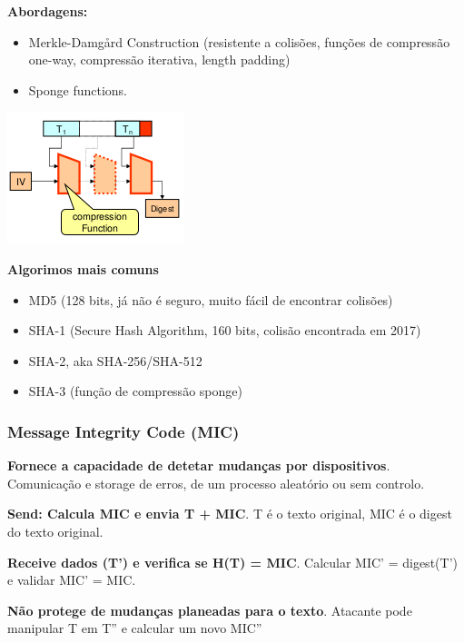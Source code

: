 \documentclass{article}
\begin{document}
\begin{flushleft}
  \textbf{Abordagens:}
  \begin{itemize}
    \item Merkle-Damgård Construction (resistente a colisões, funções
    de compressão one-way, compressão iterativa, length padding)
    \item Sponge functions.
  \end{itemize}

  \begin{center}
    \includegraphics[scale=0.4]{96}
  \end{center}

  \vspace{2mm}

  \textbf{Algorimos mais comuns}
  \begin{itemize}
    \item MD5 (128 bits, já não é seguro, muito fácil de encontrar colisões)
    \item SHA-1 (Secure Hash Algorithm, 160 bits, colisão encontrada em 2017)
    \item SHA-2, aka SHA-256/SHA-512
    \item SHA-3 (função de compressão sponge)
  \end{itemize}
\end{flushleft}

\subsubsection{Message Integrity Code (MIC)}

\begin{flushleft}
    \textbf{Fornece a capacidade de detetar mudanças por dispositivos}.
    Comunicação e storage de erros, de um processo aleatório ou sem controlo.

    \vspace{2mm}

    \textbf{Send: Calcula MIC e envia T + MIC}. T é o texto original, MIC é o
    digest do texto original.

    \vspace{2mm}

    \textbf{Receive dados (T') e verifica se H(T) = MIC}. Calcular
    MIC' = digest(T') e validar MIC' = MIC.

    \vspace{2mm}

    \textbf{Não protege de mudanças planeadas para o texto}.
    Atacante pode manipular T em T'' e calcular um novo MIC''
\end{flushleft}
\end{document}
